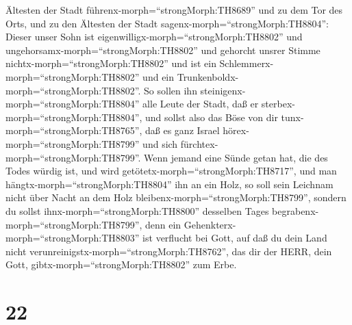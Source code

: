 Ältesten der Stadt führenx-morph=``strongMorph:TH8689'' und zu dem Tor
des Orts,  und zu den Ältesten der Stadt
sagenx-morph=``strongMorph:TH8804'': Dieser unser Sohn ist
eigenwilligx-morph=``strongMorph:TH8802'' und
ungehorsamx-morph=``strongMorph:TH8802'' und gehorcht unsrer Stimme
nichtx-morph=``strongMorph:TH8802'' und ist ein
Schlemmerx-morph=``strongMorph:TH8802'' und ein
Trunkenboldx-morph=``strongMorph:TH8802''.  So sollen ihn
steinigenx-morph=``strongMorph:TH8804'' alle Leute der Stadt, daß er
sterbex-morph=``strongMorph:TH8804'', und sollst also das Böse von dir
tunx-morph=``strongMorph:TH8765'', daß es ganz Israel
hörex-morph=``strongMorph:TH8799'' und sich
fürchtex-morph=``strongMorph:TH8799''.  Wenn jemand eine
Sünde getan hat, die des Todes würdig ist, und wird
getötetx-morph=``strongMorph:TH8717'', und man
hängtx-morph=``strongMorph:TH8804'' ihn an ein Holz,  so
soll sein Leichnam nicht über Nacht an dem Holz
bleibenx-morph=``strongMorph:TH8799'', sondern du sollst
ihnx-morph=``strongMorph:TH8800'' desselben Tages
begrabenx-morph=``strongMorph:TH8799'', denn ein
Gehenkterx-morph=``strongMorph:TH8803'' ist verflucht bei Gott, auf daß
du dein Land nicht verunreinigstx-morph=``strongMorph:TH8762'', das dir
der HERR, dein Gott, gibtx-morph=``strongMorph:TH8802'' zum Erbe.

\hypertarget{section-21}{%
\section{22}\label{section-21}}

